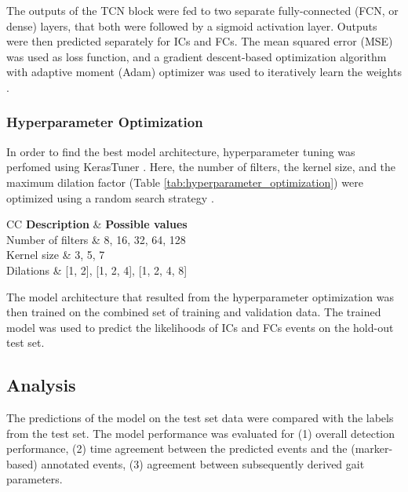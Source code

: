 \documentclass[sensors,article,submit,pdftex,moreauthors]{Definitions/mdpi}
\begin{document}
The outputs of the TCN block were fed to two separate fully-connected (FCN, or dense) layers, that both were followed by a sigmoid activation layer. Outputs were then predicted separately for ICs and FCs. The mean squared error (MSE) was used as loss function, and a gradient descent-based optimization algorithm with adaptive moment (Adam) optimizer was used to iteratively learn the weights \cite{Kingma2014,Schmidt2021}.

\subsubsection{Hyperparameter Optimization}
In order to find the best model architecture, hyperparameter tuning was perfomed using KerasTuner \cite{OMalley2019}. Here, the number of filters, the kernel size, and the maximum dilation factor (Table \ref{tab:hyperparameter_optimization}) were optimized using a random search strategy \cite{Bergstra2012}.

\begin{table}[H] 
	\caption{Model hyperparameters that were optimized for, and the corresponding sets of possible values.\label{tab:hyperparameter_optimization}}
	\begin{tabularx}{\textwidth}{CC}
		\toprule
		\textbf{Description}	& \textbf{Possible values}\\
		\midrule
		Number of filters	& 8, 16, 32, 64, 128\\
		Kernel size			& 3, 5, 7\\
		Dilations 			& [1, 2], [1, 2, 4], [1, 2, 4, 8]\\
		\bottomrule
	\end{tabularx}
\end{table}

The model architecture that resulted from the hyperparameter optimization was then trained on the combined set of training and validation data. The trained model was used to predict the likelihoods of ICs and FCs events on the hold-out test set.

\subsection{Analysis}
The predictions of the model on the test set data were compared with the labels from the test set. The model performance was evaluated for (1) overall detection performance, (2) time agreement between the predicted events and the (marker-based) annotated events, (3) agreement between subsequently derived gait parameters.
\end{document}
